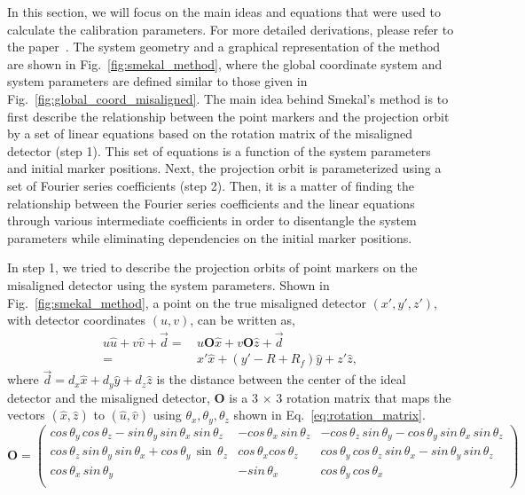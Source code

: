 In this section, we will focus on the main ideas and equations that were used to calculate the calibration parameters.  For more detailed derivations, please refer to the paper~\citep{Smekal2004}.  The system geometry and a graphical representation of the method are shown in Fig.~\ref{fig:smekal_method}, where the global coordinate system and system parameters are defined similar to those given in Fig.~\ref{fig:global_coord_misaligned}. The main idea behind Smekal's method is to first describe the relationship between the point markers and the projection orbit by a set of linear equations based on the rotation matrix of the misaligned detector (step 1). This set of equations is a function of the system parameters and initial marker positions.  Next, the projection orbit is parameterized using a set of Fourier series coefficients (step 2).  Then, it is a matter of finding the relationship between the Fourier series coefficients and the linear equations through various intermediate coefficients in order to disentangle the system parameters while eliminating dependencies on the initial marker positions.

In step 1, we tried to describe the projection orbits of point markers on the misaligned detector using the system parameters.  Shown in Fig.~\ref{fig:smekal_method}, a point on the true misaligned detector $(x', y', z')$, with detector coordinates $(u, v)$, can be written as,
%
\begin{equation}
\begin{aligned}
u \hat{u} + v \hat{v} + \vec{d} =& \, u \mathrm{\mathbf{O}} \hat{x} + v \mathrm{\mathbf{O}} \hat{z} + \vec{d} \\
								=& \, x' \hat{x} + (y' - R + R_f) \hat{y} + z' \hat{z},
\end{aligned}
\label{eq:projection_orbit}
\end{equation}
%
where $\vec{d} = d_x \hat{x} + d_y \hat{y} + d_z \hat{z}$ is the distance between the center of the ideal detector and the misaligned detector, $\mathrm{\mathbf{O}}$ is a 3 $\times$ 3 rotation matrix that maps the vectors $(\hat{x}, \hat{z})$ to $(\hat{u}, \hat{v})$ using $\theta_x, \theta_y, \theta_z$ shown in Eq.~\ref{eq:rotation_matrix}.
%
\begin{equation}
\mathrm{\mathbf{O}} = 
\begin{pmatrix}
cos\, \theta_y \, cos \,\theta_z - sin \, \theta_y \, sin \, \theta_x \, sin \, \theta_z & -cos \, \theta_x \, sin \, \theta_z & -cos \, \theta_z \, sin \, \theta_y - cos \, \theta_y \, sin \, \theta_x \, sin \, \theta_z \\
cos \, \theta_z \, sin \, \theta_y \, sin \, \theta_x + cos \, \theta_y \, \sin \, \theta_z & cos \, \theta_x cos \, \theta_z & cos \, \theta_y \, cos \, \theta_z \, sin \, \theta_x - sin \, \theta_y \, sin \, \theta_z \\
cos \, \theta_x \, sin \, \theta_y & -sin \, \theta_x & cos \, \theta_y \, cos \, \theta_x \\
\end{pmatrix}
\label{eq:rotation_matrix}
\end{equation}

